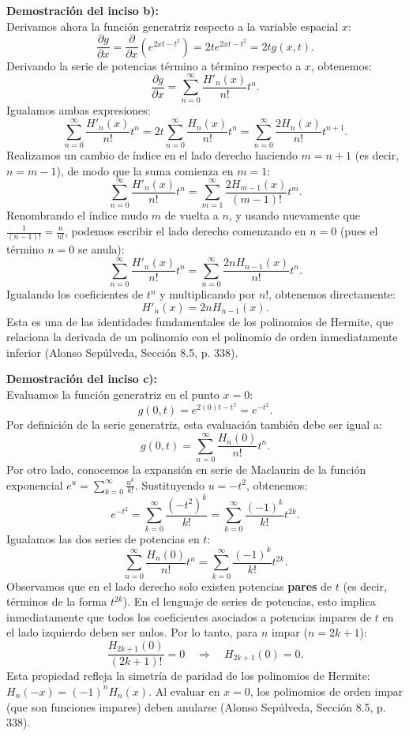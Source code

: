 \documentclass[a4paper]{article}
\begin{document}
\vspace{0.3cm}
\noindent\textbf{Demostración del inciso b):} \\
Derivamos ahora la función generatriz respecto a la variable espacial $x$:
$$
\frac{\partial g}{\partial x} = \frac{\partial}{\partial x} \left( e^{2xt - t^2} \right) = 2t e^{2xt - t^2} = 2t g(x, t).
$$
Derivando la serie de potencias término a término respecto a $x$, obtenemos:
$$
\frac{\partial g}{\partial x} = \sum_{n=0}^{\infty} \frac{H'_n(x)}{n!} t^n.
$$
Igualamos ambas expresiones:
$$
\sum_{n=0}^{\infty} \frac{H'_n(x)}{n!} t^n = 2t \sum_{n=0}^{\infty} \frac{H_n(x)}{n!} t^n = \sum_{n=0}^{\infty} \frac{2 H_n(x)}{n!} t^{n+1}.
$$
Realizamos un cambio de índice en el lado derecho haciendo $m = n + 1$ (es decir, $n = m - 1$), de modo que la suma comienza en $m = 1$:
$$
\sum_{n=0}^{\infty} \frac{H'_n(x)}{n!} t^n = \sum_{m=1}^{\infty} \frac{2 H_{m-1}(x)}{(m-1)!} t^m.
$$
Renombrando el índice mudo $m$ de vuelta a $n$, y usando nuevamente que $\frac{1}{(n-1)!} = \frac{n}{n!}$, podemos escribir el lado derecho comenzando en $n=0$ (pues el término $n=0$ se anula):
$$
\sum_{n=0}^{\infty} \frac{H'_n(x)}{n!} t^n = \sum_{n=0}^{\infty} \frac{2n H_{n-1}(x)}{n!} t^n.
$$
Igualando los coeficientes de $t^n$ y multiplicando por $n!$, obtenemos directamente:
$$
H'_n(x) = 2n H_{n-1}(x).
$$
Esta es una de las identidades fundamentales de los polinomios de Hermite, que relaciona la derivada de un polinomio con el polinomio de orden inmediatamente inferior (Alonso Sepúlveda, Sección 8.5, p. 338).

\vspace{0.3cm}
\noindent\textbf{Demostración del inciso c):} \\
Evaluamos la función generatriz en el punto $x = 0$:
$$
g(0, t) = e^{2(0)t - t^2} = e^{-t^2}.
$$
Por definición de la serie generatriz, esta evaluación también debe ser igual a:
$$
g(0, t) = \sum_{n=0}^{\infty} \frac{H_n(0)}{n!} t^n.
$$
Por otro lado, conocemos la expansión en serie de Maclaurin de la función exponencial $e^u = \sum_{k=0}^{\infty} \frac{u^k}{k!}$. Sustituyendo $u = -t^2$, obtenemos:
$$
e^{-t^2} = \sum_{k=0}^{\infty} \frac{(-t^2)^k}{k!} = \sum_{k=0}^{\infty} \frac{(-1)^k}{k!} t^{2k}.
$$
Igualamos las dos series de potencias en $t$:
$$
\sum_{n=0}^{\infty} \frac{H_n(0)}{n!} t^n = \sum_{k=0}^{\infty} \frac{(-1)^k}{k!} t^{2k}.
$$
Observamos que en el lado derecho solo existen potencias \textbf{pares} de $t$ (es decir, términos de la forma $t^{2k}$). En el lenguaje de series de potencias, esto implica inmediatamente que todos los coeficientes asociados a potencias impares de $t$ en el lado izquierdo deben ser nulos. Por lo tanto, para $n$ impar ($n = 2k + 1$):
$$
\frac{H_{2k+1}(0)}{(2k+1)!} = 0 \quad \Longrightarrow \quad H_{2k+1}(0) = 0.
$$
Esta propiedad refleja la simetría de paridad de los polinomios de Hermite: $H_n(-x) = (-1)^n H_n(x)$. Al evaluar en $x=0$, los polinomios de orden impar (que son funciones impares) deben anularse (Alonso Sepúlveda, Sección 8.5, p. 338).
\end{document}
